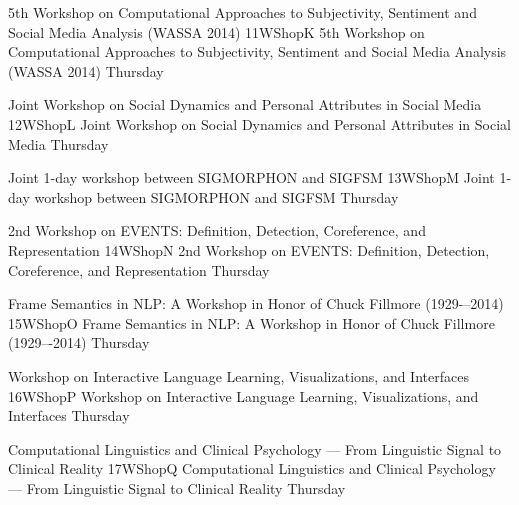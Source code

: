 \begin{wsschedule}
  {5th Workshop on Computational Approaches to Subjectivity, Sentiment and Social Media Analysis (WASSA 2014)}
  {11}{WShopK}
  {5th Workshop on Computational Approaches to Subjectivity, Sentiment and Social Media Analysis (WASSA 2014)}
  {Thursday}
  {\WShopLocK}
  
\end{wsschedule}
\begin{wsschedule}
  {Joint Workshop on Social Dynamics and Personal Attributes in Social Media}
  {12}{WShopL}
  {Joint Workshop on Social Dynamics and Personal Attributes in Social Media}
  {Thursday}
  {\WShopLocL}
  
\end{wsschedule}
\begin{wsschedule}
  {Joint 1-day workshop between SIGMORPHON and SIGFSM}
  {13}{WShopM}
  {Joint 1-day workshop between SIGMORPHON and SIGFSM}
  {Thursday}
  {\WShopLocM}
  
\end{wsschedule}
\begin{wsschedule}
  {2nd Workshop on EVENTS: Definition, Detection, Coreference, and Representation}
  {14}{WShopN}
  {2nd Workshop on EVENTS: Definition, Detection, Coreference, and Representation}
  {Thursday}
  {\WShopLocN}
  
\end{wsschedule}
\begin{wsschedule}
  {Frame Semantics in NLP: A Workshop in Honor of Chuck Fillmore (1929-–2014)}
  {15}{WShopO}
  {Frame Semantics in NLP: A Workshop in Honor of Chuck Fillmore (1929–-2014)}
  {Thursday}
  {\WShopLocO}
  
\end{wsschedule}
\begin{wsschedule}
  {Workshop on Interactive Language Learning, Visualizations, and Interfaces}
  {16}{WShopP}
  {Workshop on Interactive Language Learning, Visualizations, and Interfaces}
  {Thursday}
  {\WShopLocP}
  
\end{wsschedule}
\begin{wsschedule}
  {Computational Linguistics and Clinical Psychology --- From Linguistic Signal to Clinical Reality}
  {17}{WShopQ}
  {Computational Linguistics and Clinical Psychology --- From Linguistic Signal to Clinical Reality}
  {Thursday}
  {\WShopLocQ}
  
\end{wsschedule}

\clearpage{\thispagestyle{emptyheader}\cleardoublepage}
